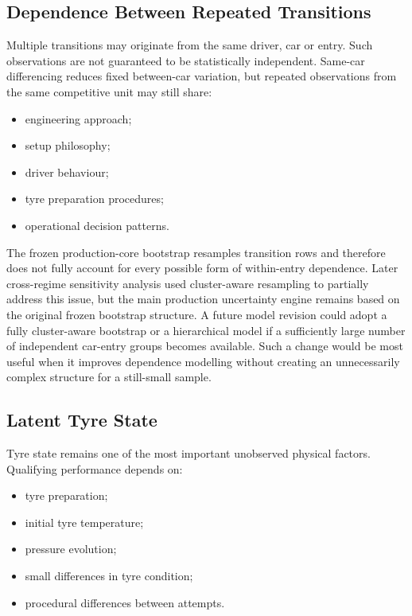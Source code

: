 \subsection{Dependence Between Repeated Transitions}
Multiple transitions may originate from the same driver, car or entry. Such observations are not guaranteed to be statistically independent. Same-car differencing reduces fixed between-car variation, but repeated observations from the same competitive unit may still share:

\begin{itemize}
\item engineering approach;
\item setup philosophy;
\item driver behaviour;
\item tyre preparation procedures;
\item operational decision patterns.
\end{itemize}

The frozen production-core bootstrap resamples transition rows and therefore does not fully account for every possible form of within-entry dependence. Later cross-regime sensitivity analysis used cluster-aware resampling to partially address this issue, but the main production uncertainty engine remains based on the original frozen bootstrap structure. A future model revision could adopt a fully cluster-aware bootstrap or a hierarchical model if a sufficiently large number of independent car-entry groups becomes available. Such a change would be most useful when it improves dependence modelling without creating an unnecessarily complex structure for a still-small sample.

\subsection{Latent Tyre State}
Tyre state remains one of the most important unobserved physical factors. Qualifying performance depends on:

\begin{itemize}
\item tyre preparation;
\item initial tyre temperature;
\item pressure evolution;
\item small differences in tyre condition;
\item procedural differences between attempts.
\end{itemize}

